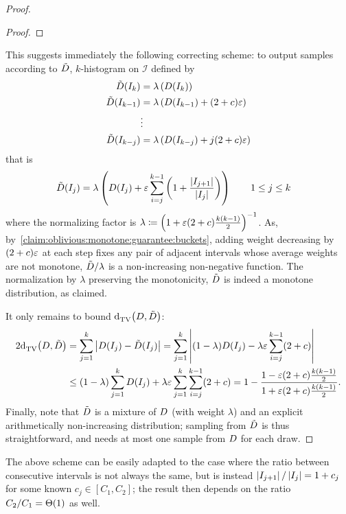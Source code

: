 \begin{proof}
\begin{proof}
    \end{proof}
    This suggests immediately the following correcting scheme: to output samples according to $\tilde{D}$, $k$-histogram on $\mathcal{I}$ defined by
    \begin{align*}
      \tilde{D}(I_k) &= \lambda\left( D(I_k)  \right) \\ 
      \tilde{D}(I_{k-1}) &= \lambda\left( D(I_{k-1}) + (2+c)\varepsilon  \right) \\ 
      &\vdots\\
      \tilde{D}(I_{k-j}) &= \lambda\left( D(I_{k-j}) + j(2+c)\varepsilon  \right) \\ 
    \end{align*}
    that is
    \begin{align*}
      \tilde{D}(I_j) &= \lambda\left( D(I_j) + \varepsilon\sum_{i=j}^{k-1}\left(1+\frac{\left\lvert I_{j+1} \right\rvert}{\left\lvert I_j \right\rvert}\right)  \right) \qquad 1\leq j\leq k
    \end{align*}
    where the normalizing factor is $\lambda\coloneqq \left( 1+\varepsilon(2+c)\frac{k(k-1)}{2} \right)^{-1}$. As, 
    by~\autoref{claim:oblivious:monotone:guarantee:buckets}, 
    adding weight decreasing by $(2+c)\varepsilon$ at each step fixes any pair of adjacent intervals
    whose average weights are not monotone,
    $\tilde{D}/\lambda$ is a non-increasing non-negative function. The normalization by $\lambda$ preserving the monotonicity, $\tilde{D}$ is indeed a monotone distribution, as claimed.

    \noindent It only remains to bound ${\operatorname{d}_{\textrm{TV}}^{}\!\left({D, \tilde{D}}\right)}$:
    \begin{align*}
      2{\operatorname{d}_{\textrm{TV}}^{}\!\left({D, \tilde{D}}\right)} &= \sum_{j=1}^{k} \left\lvert  D(I_j) - \tilde{D}(I_j)  \right\rvert = \sum_{j=1}^{k} \left\lvert  (1-\lambda)D(I_j) - \lambda\varepsilon \sum_{i=j}^{k-1} (2+c)  \right\rvert \\
      &\leq (1-\lambda)\sum_{j=1}^{k} D(I_j) + \lambda\varepsilon \sum_{j=1}^{k}\sum_{i=j}^{k-1}(2+c) = 1-\frac{1-\varepsilon(2+c)\frac{k(k-1)}{2}}{1+\varepsilon(2+c)\frac{k(k-1)}{2}  }.
    \end{align*}
    Finally, note that $\tilde{D}$ is a mixture of $D$ (with weight $\lambda$) and an explicit arithmetically non-increasing distribution; sampling from $\tilde{D}$ is thus straightforward, and needs at most one sample from $D$ for each draw.
    \end{proof}
    \begin{remark}
    The above scheme can be easily adapted to the case where the ratio between consecutive intervals is not always the same, but is instead $\left\lvert I_{j+1} \right\rvert/\left\lvert I_j \right\rvert = 1+c_j$ for some known $c_j\in[C_1,C_2]$; the result 
    then depends on the ratio  $C_2/C_1=\bigTheta{1}$ as well.
    \end{remark}

